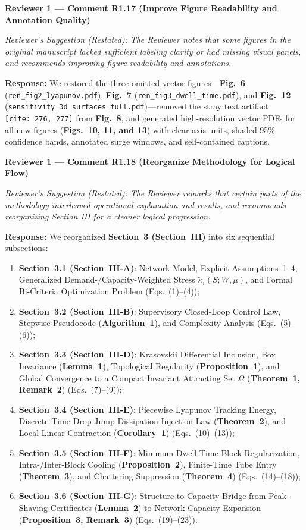 \documentclass[11pt,a4paper]{article}
\newcommand{\cbox}[2]{%
  \vspace{0.6em}\noindent\textbf{#1}\par\smallskip
  \noindent\textit{Reviewer's Suggestion (Restated):} \textit{#2}\par\smallskip
}
\begin{document}
\hrulefill

\cbox{Reviewer 1 --- Comment R1.17 (Improve Figure Readability and Annotation Quality)}{The Reviewer notes that some figures in the original manuscript lacked sufficient labeling clarity or had missing visual panels, and recommends improving figure readability and annotations.}

\noindent\textbf{Response:} We restored the three omitted vector figures---\textbf{Fig.~6} (\texttt{ren\_fig2\_lyapunov.pdf}), \textbf{Fig.~7} (\texttt{ren\_fig3\_dwell\_time.pdf}), and \textbf{Fig.~12} (\texttt{sensitivity\_3d\_surfaces\_full.pdf})---removed the stray text artifact \texttt{[cite:\ 276, 277]} from \textbf{Fig.~8}, and generated high-resolution vector PDFs for all new figures (\textbf{Figs.~10, 11, and 13}) with clear axis units, shaded 95\% confidence bands, annotated surge windows, and self-contained captions.

\hrulefill

\cbox{Reviewer 1 --- Comment R1.18 (Reorganize Methodology for Logical Flow)}{The Reviewer remarks that certain parts of the methodology interleaved operational explanation and results, and recommends reorganizing Section III for a cleaner logical progression.}

\noindent\textbf{Response:} We reorganized \textbf{Section~3 (Section~III)} into six sequential subsections:
\begin{enumerate}[leftmargin=1.8em]
    \item \textbf{Section~3.1 (Section~III-A)}: Network Model, Explicit Assumptions~1--4, Generalized Demand-/Capacity-Weighted Stress $\widetilde{\kappa}_i(S;W,\mu)$, and Formal Bi-Criteria Optimization Problem (Eqs.~(1)--(4));
    \item \textbf{Section~3.2 (Section~III-B)}: Supervisory Closed-Loop Control Law, Stepwise Pseudocode (\textbf{Algorithm~1}), and Complexity Analysis (Eqs.~(5)--(6));
    \item \textbf{Section~3.3 (Section~III-D)}: Krasovskii Differential Inclusion, Box Invariance (\textbf{Lemma~1}), Topological Regularity (\textbf{Proposition~1}), and Global Convergence to a Compact Invariant Attracting Set $\Omega$ (\textbf{Theorem~1, Remark~2}) (Eqs.~(7)--(9));
    \item \textbf{Section~3.4 (Section~III-E)}: Piecewise Lyapunov Tracking Energy, Discrete-Time Drop-Jump Dissipation-Injection Law (\textbf{Theorem~2}), and Local Linear Contraction (\textbf{Corollary~1}) (Eqs.~(10)--(13));
    \item \textbf{Section~3.5 (Section~III-F)}: Minimum Dwell-Time Block Regularization, Intra-/Inter-Block Cooling (\textbf{Proposition~2}), Finite-Time Tube Entry (\textbf{Theorem~3}), and Chattering Suppression (\textbf{Theorem~4}) (Eqs.~(14)--(18));
    \item \textbf{Section~3.6 (Section~III-G)}: Structure-to-Capacity Bridge from Peak-Shaving Certificates (\textbf{Lemma~2}) to Network Capacity Expansion (\textbf{Proposition~3, Remark~3}) (Eqs.~(19)--(23)).
\end{enumerate}
\end{document}
